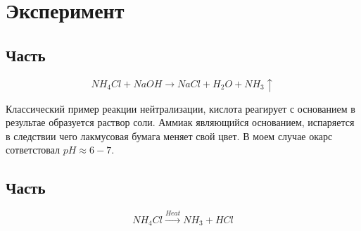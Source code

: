 \section{Эксперимент}
\subsection{Часть}
\begin{equation}
    NH_4Cl + NaOH \to NaCl + H_2O + NH_3 \uparrow
\end{equation}

Классический пример реакции нейтрализации, кислота реагирует
с основанием в результае образуется раствор соли. Аммиак 
являющийся основанием, испаряется в следствии чего лакмусовая 
бумага меняет свой цвет. В моем случае окарс сответстовал 
$pH \approx 6-7$.



\subsection{Часть}

\begin{equation}
    NH_4Cl \xrightarrow{Heat} NH_3 + HCl
\end{equation}






